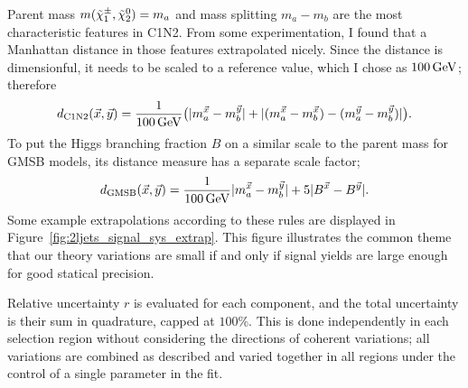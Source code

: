 Parent mass $m(\chargino_1, \neutralino_2) = m_a$
and mass splitting $m_a - m_b$ are the most
characteristic features in C1N2.
From some experimentation, I found that a Manhattan distance in those features
extrapolated nicely.
Since the distance is dimensionful, it needs to be scaled to a reference value,
which I chose as $100\,\eV[G]$; therefore
\begin{equation}
d_\mathrm{C1N2}(\vec x, \vec y) =
\frac{1}{100\,\eV[G]}
\big(
|m_a^{\vec x} - m_b^{\vec y}|
+
|(m_a^{\vec x} - m_b^{\vec x}) - (m_a^{\vec y} - m_b^{\vec y})|
\big)
.
\end{equation}
To put the Higgs branching fraction $B$ on a similar scale to the parent mass
for GMSB models, its distance measure has a separate scale factor;
\begin{equation}
d_\mathrm{GMSB}(\vec x, \vec y) =
\frac{1}{100\,\eV[G]}
|m_a^{\vec x} - m_b^{\vec y}|
+
5
|B^{\vec x} - B^{\vec y}|
.
\end{equation}
Some example extrapolations according to these rules are displayed in
Figure~\ref{fig:2ljets_signal_sys_extrap}.
This figure illustrates the common theme that our theory variations are small
if and only if signal yields are large enough for good statical precision.

Relative uncertainty $r$ is evaluated for each component, and the total
uncertainty is their sum in quadrature, capped at $100\%$.
This is done independently in each selection region without considering the
directions of coherent variations; all variations are combined as described
and varied together in all regions under the control of a single parameter in
the fit.

